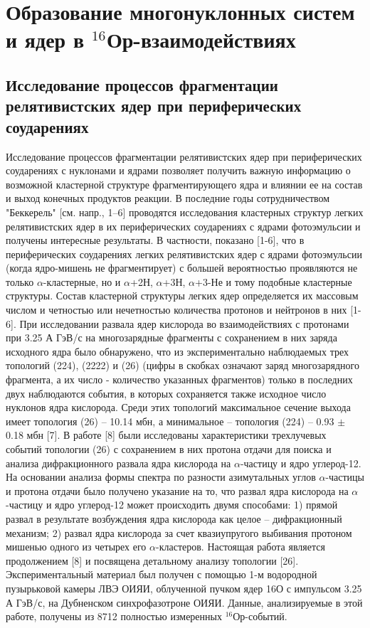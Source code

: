 \documentclass[fontsize=14pt]{scrarticle}
\begin{document}
\section{Образование многонуклонных систем и ядер в $^{16}$Ор-взаимодействиях}
\subsection{Исследование процессов фрагментации релятивистских ядер при периферических соударениях}
\hspace{0.6cm}
Исследование процессов фрагментации релятивистских ядер при периферических соударениях с нуклонами и ядрами позволяет получить важную информацию о возможной кластерной структуре фрагментирующего ядра и влиянии ее на состав и выход конечных продуктов реакции. В последние годы сотрудничеством "Беккерель" [см. напр., 1–6] проводятся исследования кластерных структур легких релятивистских ядер в их периферических соударениях с ядрами фотоэмульсии и получены интересные результаты. В частности, показано [1-6], что в периферических соударениях легких релятивистских ядер с ядрами фотоэмульсии (когда ядро-мишень не фрагментирует) с большей вероятностью проявляются не только $\alpha$-кластерные, но и $\alpha$+2Н, $\alpha$+3Н, $\alpha$+3-Не и тому подобные кластерные структуры. Состав кластерной структуры легких ядер определяется их массовым числом и четностью или нечетностью количества протонов и нейтронов в них [1-6]. При исследовании развала ядер кислорода во взаимодействиях с протонами при 3.25 А ГэВ/с на многозарядные фрагменты с сохранением в них заряда исходного ядра было обнаружено, что из экспериментально наблюдаемых трех топологий (224), (2222) и (26) (цифры в скобках означают заряд многозарядного фрагмента, а их число - количество указанных фрагментов) только в последних
двух наблюдаются события, в которых сохраняется также исходное число нуклонов ядра кислорода. Среди этих топологий максимальное сечение выхода имеет топология (26) – 10.14 мбн, а минимальное – топология (224) – 0.93 $\pm$ 0.18 мбн [7]. В работе [8] были исследованы характеристики трехлучевых событий топологии (26) с сохранением в них протона отдачи для поиска и анализа дифракционного развала ядра кислорода на $\alpha$-частицу и ядро углерод-12. На основании анализа формы спектра по разности азимутальных углов $\alpha$-частицы и протона отдачи было получено указание на то, что развал ядра кислорода на $\alpha$-частицу и ядро углерод-12 может происходить двумя способами: 1) прямой развал в результате возбуждения ядра кислорода как целое – дифракционный механизм; 2) развал ядра кислорода за счет квазиупругого выбивания протоном мишенью одного из четырех его $\alpha$-кластеров. Настоящая работа является продолжением [8] и посвящена детальному анализу топологии [26]. Экспериментальный материал был получен с помощью 1-м водородной пузырьковой камеры ЛВЭ ОИЯИ, облученной пучком ядер 16О с импульсом 3.25 А ГэВ/с, на Дубненском  синхрофазотроне ОИЯИ. Данные, анализируемые в этой работе, получены из 8712 полностью измеренных $^{16}$Ор-событий.
\end{document}
